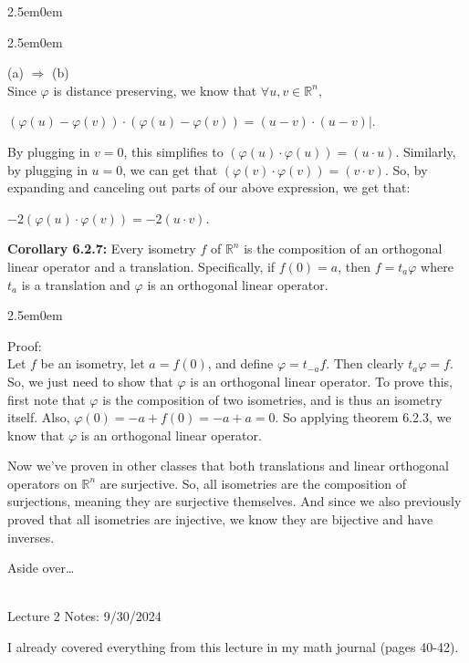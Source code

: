 \documentclass{book}
\newcommand{\hThree}{%
   \color{PineGreen!85!Orange}
   \fontsize{12}{14}\selectfont%
}
\newenvironment{myIndent}{%
   \begin{adjustwidth}{2.5em}{0em}%
}{%
   \end{adjustwidth}%
}
\newcommand{\blab}[1]{\textbf{#1}}
\newcommand{\mySepTwo}[1][.]{%
   {\noindent\color{#1}{\rule{6.5in}{0.5mm}}}\\%
}
\newcommand{\retTwo}{\hfill\bigbreak}
\newcommand{\mHeader}[1]{{
   \color{Black}%
   \fontsize{20}{18}\selectfont%
   #1\retTwo
}}
\begin{document}
\begin{myIndent}
\begin{itemize}
\begin{myIndent}
			(a) $\Longrightarrow$ (b)\\
			Since $\varphi$ is distance preserving, we know that $\forall u, v \in \mathbb{R}^n$, 

			{\centering$(\varphi(u) - \varphi(v)) \cdot (\varphi(u) - \varphi(v)) = (u - v) \cdot (u -v)|$.\retTwo\par}

			By plugging in $v = 0$, this simplifies to $(\varphi(u) \cdot \varphi(u)) = (u \cdot u)$. Similarly, by plugging in $u = 0$, we can get that $(\varphi(v) \cdot \varphi(v)) = (v \cdot v)$. So, by expanding and canceling out parts of our above expression, we get that:

			{\centering$-2(\varphi(u) \cdot \varphi(v)) = - 2(u \cdot v)$.\retTwo\par}
		\end{myIndent}
	\end{itemize}

	\blab{Corollary 6.2.7:} Every isometry $f$ of $\mathbb{R}^n$ is the composition of an orthogonal linear operator and a translation. Specifically, if $f(0) = a$, then $f = t_a\varphi$ where $t_a$ is a translation and $\varphi$ is an orthogonal linear operator.

	\begin{myIndent}\hThree
		Proof:\\
		Let $f$ be an isometry, let $a = f(0)$, and define $\varphi = t_{-a}f$. Then clearly $t_a\varphi = f$. So, we just need to show that $\varphi$ is an orthogonal linear operator. To prove this, first note that $\varphi$ is the composition of two isometries, and is thus an isometry itself. Also, $\varphi(0) = -a + f(0) = -a + a = 0$. So applying theorem 6.2.3, we know that $\varphi$ is an orthogonal linear operator.\retTwo
	\end{myIndent}
\end{myIndent}

Now we've proven in other classes that both translations and linear orthogonal\\ operators on $\mathbb{R}^n$ are surjective. So, all isometries are the composition of surjections, meaning they are surjective themselves. And since we also previously proved that all isometries are injective, we know they are bijective and have inverses.\retTwo

Aside over\dots

\mySepTwo

\mHeader{Lecture 2 Notes: 9/30/2024}

I already covered everything from this lecture in my math journal (pages 40-42).\\
\end{document}
